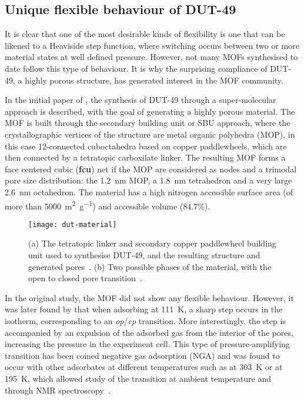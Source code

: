 \subsection{Unique flexible behaviour of DUT-49}

It is clear that one of the most desirable kinds of flexibility
is one that can be likened to a Heaviside step function, 
where switching occurs between two or more material states at 
well defined pressure. However, not many
MOFs synthesised to date follow this type of behaviour.
It is why the surprising compliance of DUT-49, a highly porous 
structure, has generated interest in the MOF community.

In the initial paper of \citet{stoeckHighlyPorousMetal2012}, the 
synthesis of DUT-49 through a super-molecular approach is 
described, with the goal of generating a highly porous material. 
The MOF is built through the secondary building unit or SBU 
approach, where the crystallographic vertices of the structure are 
metal organic polyhedra (MOP), in this case 12-connected cuboctahedra
based on copper paddlewheels, which are then connected by a tetratopic
carboxilate linker. The resulting MOF forms a face centered cubic 
(\textbf{fcu}) net if the MOP are considered as nodes and a trimodal 
pore size distribution: the \SI{1.2}{\nano\metre} MOP, a \SI{1.8}{\nano\metre}
tetrahedron and a very large \SI{2.6}{\nano\metre} octahedron.
The material has a high nitrogen accessible surface area (of more
than \SI{5000}{\metre^2\per\gram}) and accessible volume (84.7\%).

\begin{figure}[htb]
    \centering
    \texttt{[image: dut-material]}%
    \caption{(a) The tetratopic linker and secondary copper 
    paddlewheel building unit used to synthesise DUT-49, 
    and the resulting structure and generated 
    pores~\cite{stoeckHighlyPorousMetal2012}. (b)
    Two possible phases of the material, with the 
    open to closed pore 
    transition~\cite{krausePressureamplifyingFrameworkMaterial2016}.}%
    \label{dut:fgr:dut-material}
\end{figure}

In the original study, the MOF did not show any flexible behaviour.
However, it was later found by 
\citet{krausePressureamplifyingFrameworkMaterial2016} that 
when adsorbing  at \SI{111}{\kelvin}, a sharp step occurs
in the isotherm, corresponding to an \textit{op}/\textit{cp} transition. 
More interestingly, the step is accompanied by an expulsion of the
adsorbed gas from the interior of the pores, increasing the pressure
in the experiment cell. This type of pressure-amplifying transition
has been coined negative gas adsorption (NGA) and was found to 
occur with other adsorbates at different temperatures such as  
at \SI{303}{\kelvin} or  at \SI{195}{\kelvin}, which allowed
study of the transition at ambient temperature and through 
 NMR spectroscopy~\cite{schaberSituMonitoringUnique2017}.

